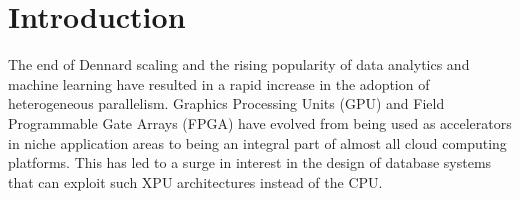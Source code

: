 \documentclass[sigconf, nonacm]{acmart}
\newcommand\vldbdoi{XX.XX/XXX.XX}
\newcommand\vldbpages{XXX-XXX}
\newcommand\vldbvolume{14}
\newcommand\vldbissue{1}
\newcommand\vldbyear{2020}
\newcommand\vldbauthors{\authors}
\newcommand\vldbtitle{\shorttitle}
\newcommand\vldbavailabilityurl{URL_TO_YOUR_ARTIFACTS}
\newcommand\vldbpagestyle{plain}
\begin{document}
\maketitle






\section{Introduction}
The end of Dennard scaling and the rising popularity of data analytics and machine learning have resulted in a rapid increase in the adoption of heterogeneous parallelism. Graphics Processing Units
(GPU) and Field Programmable Gate Arrays (FPGA) have evolved
from being used as accelerators in niche application areas to being an integral part of almost all cloud computing platforms. This has
led to a surge in interest in the design of database systems that can
exploit such XPU architectures instead of the CPU. 
\end{document}
